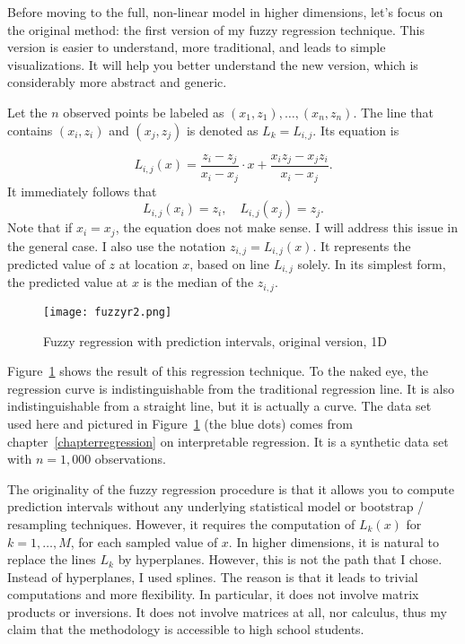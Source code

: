 \documentclass[oneside,10pt]{book}
\begin{document}
Before moving to the full, non-linear model in higher dimensions, let's focus on the original method: the first version of my fuzzy regression technique. This version is easier to understand, more traditional, and leads to
simple visualizations. It will help you better understand the new version, which is considerably more abstract and generic.

Let the $n$ observed points be labeled as $(x_1,z_1),\dots,(x_n,z_n)$. The line that contains $(x_i,z_i)$ and $(x_j,z_j)$ is denoted as
$L_k = L_{i,j}$. Its equation is

$$
L_{i,j}(x)=\frac{z_{i}-z_j}{x_i-x_j} \cdot x + \frac{ x_iz_j-x_jz_i}{x_i-x_j}.
$$
It immediately follows that
$$
L_{i,j}(x_i)=z_i, \quad L_{i,j}(x_j)=z_j.
$$
Note that if $x_i=x_j$, the equation does not make sense. I will address this issue in the general case. I also use the notation $z_{i,j}=L_{i,j}(x)$. It represents the predicted value of $z$ at location $x$, based on line $L_{i,j}$ solely. In its simplest form, the predicted value at $x$ is the median of the $z_{i,j}$.

\begin{figure}%
\centering
\texttt{[image: fuzzyr2.png]}
\caption{Fuzzy regression with prediction intervals, original version, 1D}
\label{fig:fuzzyr}
\end{figure}


Figure~\ref{fig:fuzzyr} shows the result of this regression technique. To the naked eye, the regression curve is indistinguishable from the traditional regression line.  It is also indistinguishable from a straight line, but it is actually a curve. The data set used here and pictured in Figure~\ref{fig:fuzzyr} (the blue dots) comes from chapter~\ref{chapterregression} on interpretable  regression. It is a synthetic data set with $n=1,000$ observations.

The originality of the fuzzy regression procedure is that it allows you to compute prediction intervals without any underlying statistical model or bootstrap / resampling techniques.  However, it requires the computation of $L_k(x)$ for $k=1,\dots,M$, for each sampled value of $x$. In higher dimensions, it is natural to replace the lines $L_k$ by hyperplanes. However, this is not the path that I chose. Instead of hyperplanes, I used splines. The reason is that it leads to trivial computations and
more flexibility. In particular, it does not involve matrix products or inversions. It does not involve matrices at all, nor calculus, thus my claim that the methodology is accessible to high school students.
\end{document}
